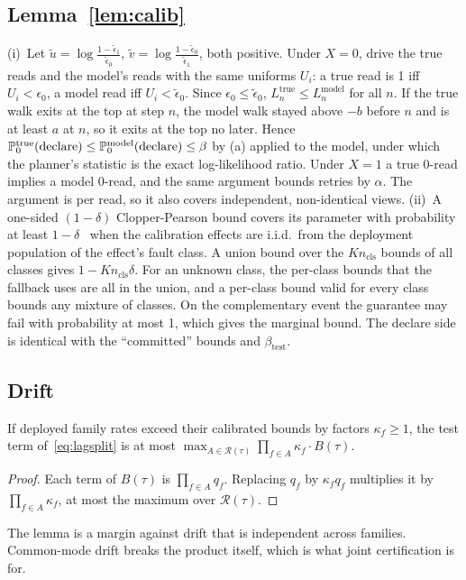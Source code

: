 \subsection{Lemma~\ref{lem:calib}}
(i)~Let $\tilde u=\log\frac{1-\tilde\epsilon_1}{\tilde\epsilon_0}$, $\tilde v=\log\frac{1-\tilde\epsilon_0}{\tilde\epsilon_1}$, both positive. Under $X{=}0$, drive the true reads and the model's
reads with the same uniforms $U_i$: a true read is 1 iff $U_i<\epsilon_0$, a model read iff $U_i<\tilde\epsilon_0$. Since $\epsilon_0\le\tilde\epsilon_0$, $L^{\mathrm{true}}_n\le L^{\mathrm{model}}_n$
for all $n$. If the true walk exits at the top at step $n$, the model walk stayed above $-b$ before $n$ and is at least $a$ at $n$, so it exits at the top no later. Hence
$\mathbb{P}^{\mathrm{true}}_0(\text{declare})\le\mathbb{P}^{\mathrm{model}}_0(\text{declare})\le\beta$ by (a) applied to the model, under which the planner's statistic is the exact log-likelihood ratio.
Under $X{=}1$ a true 0-read implies a model 0-read, and the same argument bounds retries by $\alpha$. The argument is per read, so it also covers independent, non-identical views.
(ii)~A one-sided $(1-\delta)$ Clopper-Pearson bound covers its parameter with probability at least $1-\delta$~\cite{clopper1934use} when the calibration effects are i.i.d.\ from the deployment
population of the effect's fault class. A union bound over the $Kn_{\mathrm{cls}}$ bounds of all classes gives $1-Kn_{\mathrm{cls}}\delta$. For an unknown class, the per-class bounds that
the fallback uses are all in the union, and a per-class bound valid for every class bounds any mixture of classes. On the complementary event the guarantee may fail
with probability at most 1, which gives the marginal bound. The
declare side is identical with the ``committed'' bounds and $\beta_{\mathrm{test}}$.

\subsection{Drift}
\begin{lemma}
\label{lem:drift}
If deployed family rates exceed their calibrated bounds by factors $\kappa_f\ge1$, the test term of~\eqref{eq:lagsplit} is at most $\max_{A\in\mathcal R(\tau)}\prod_{f\in A}\kappa_f\cdot B(\tau)$.
\end{lemma}
\begin{proof}
Each term of $B(\tau)$ is $\prod_{f\in A}q_f$. Replacing $q_f$ by $\kappa_fq_f$ multiplies it by $\prod_{f\in A}\kappa_f$, at most the maximum over $\mathcal R(\tau)$.
\end{proof}
The lemma is a margin against drift that is independent across families. Common-mode drift breaks the product itself, which is what joint certification is for.

